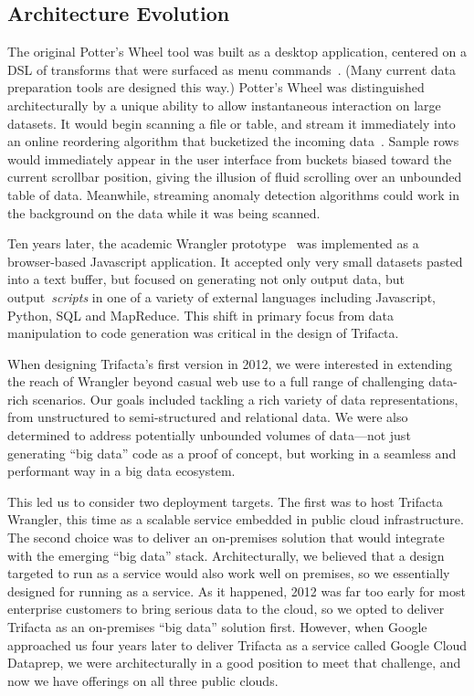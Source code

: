 \documentclass[11pt]{article}
\begin{document}
\subsection{Architecture Evolution}
The original Potter's Wheel tool was built as a desktop application,
centered on a DSL of transforms that were surfaced as menu commands~\cite{raman2001potter}. (Many current data preparation tools are designed this way.)
Potter's Wheel was distinguished architecturally by a unique ability to allow instantaneous interaction on large datasets. It would begin scanning a file or table, and stream it immediately into an online reordering algorithm that bucketized the incoming data~\cite{raman1999online}. Sample rows would immediately appear in the user interface from buckets biased toward the current scrollbar position, giving the illusion of fluid scrolling over an unbounded table of data. Meanwhile, streaming anomaly detection algorithms could work in the background on the data while it was being scanned. 

Ten years later, the academic Wrangler prototype~\cite{wrangler} was implemented as a browser-based Javascript application. It accepted only very small datasets pasted into a text buffer, but focused on generating not only output data, but output~\emph{scripts} in one of a variety of external languages including Javascript, Python, SQL and MapReduce.  
This shift in primary focus from data manipulation to code generation was critical in the design of Trifacta.

When designing Trifacta's first version in 2012, we were interested in extending the reach of Wrangler beyond casual web use to a full range of challenging data-rich scenarios. Our goals included tackling a rich variety of data representations, from unstructured to semi-structured and relational data. We were also determined to address potentially unbounded volumes of data---not just generating ``big data'' code as a proof of concept, but working in a seamless and performant way in a big data ecosystem.

This led us to consider two deployment targets. The first was to host Trifacta Wrangler, this time as a scalable service embedded in public cloud infrastructure. The second choice was to deliver an on-premises solution that would integrate with the emerging ``big data'' stack. Architecturally, we believed that a design targeted to run as a service would also work well on premises, so we essentially designed for running as a service. As it happened, 2012 was far too early for most enterprise customers to bring serious data to the cloud, so we opted to deliver Trifacta as an on-premises ``big data'' solution first. However, when Google approached us four years later to deliver Trifacta as a service called Google Cloud Dataprep, we were architecturally in a good position to meet that challenge, and now we have offerings on all three public clouds.
\end{document}
